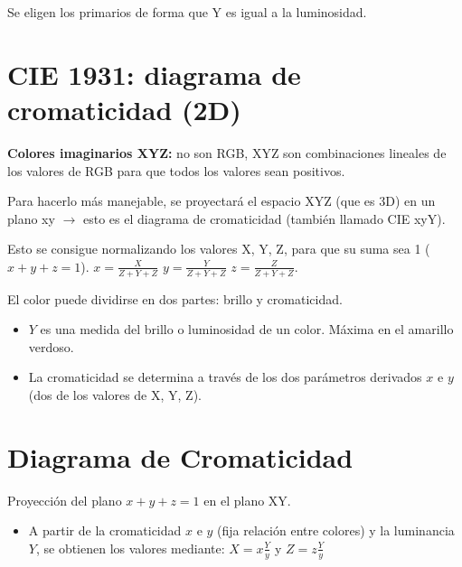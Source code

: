Se eligen los primarios de forma que Y es igual a la luminosidad.

\section{CIE 1931: diagrama de cromaticidad (2D)}
\textbf{Colores imaginarios XYZ:} no son RGB, XYZ son combinaciones lineales de los valores de RGB para que todos los valores sean positivos.

Para hacerlo más manejable, se proyectará el espacio XYZ (que es 3D) en un plano xy $\rightarrow$ esto es el diagrama de cromaticidad (también llamado CIE xyY).

Esto se consigue normalizando los valores X, Y, Z, para que su suma sea 1 ($x+y+z=1$). $x=\frac{X}{Z+Y+Z}$ $y=\frac{Y}{Z+Y+Z}$ $z=\frac{Z}{Z+Y+Z}$.

El color puede dividirse en dos partes: brillo y cromaticidad.
\begin{itemize}
	\item $Y$ es una medida del brillo o luminosidad de un color. Máxima en el amarillo verdoso.
	\item La cromaticidad se determina a través de los dos parámetros derivados $x$ e $y$ (dos
	      de los valores de X, Y, Z).
\end{itemize}

\section{Diagrama de Cromaticidad}
Proyección del plano $x+y+z=1$ en el plano XY.
\begin{itemize}
	\item A partir de la cromaticidad $x$ e $y$ (fija relación entre colores) y la luminancia $Y$, se obtienen los valores mediante: $X=x\frac{Y}{y}$ y $Z=z\frac{Y}{y}$
\end{itemize}

